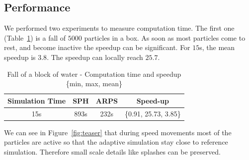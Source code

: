 \documentclass[11pt, oneside, a4paper]{memoir}
\begin{document}
\subsection{Performance}
We performed two experiments to measure computation time.
The first one (Table~\ref{table:perf1}) is a fall of $5000$ particles in a box.
As soon as most particles come to rest, and become inactive the speedup can be significant.
For $15$s, the mean speedup is $3.8$.
The speedup can locally reach $25.7$.
\begin{table}[htb]
   \centering
\begin{tabular}{|c|c|c|c|} \hline
    Simulation Time & SPH   & ARPS    & Speed-up \\ \hline
    15s     & 893s   & 232s                 &  \{0.91, 25.73, 3.85\}\\ \hline
\end{tabular}
\caption{\label{table:perf1}Fall of a block of water - Computation time and speedup \{min, max, mean\}}
\end{table}
We can see in Figure~\ref{fig:teaser} that during speed movements most of the particles are active so that the adaptive simulation stay close to reference simulation.
Therefore small scale details like splashes can be preserved.
\end{document}
